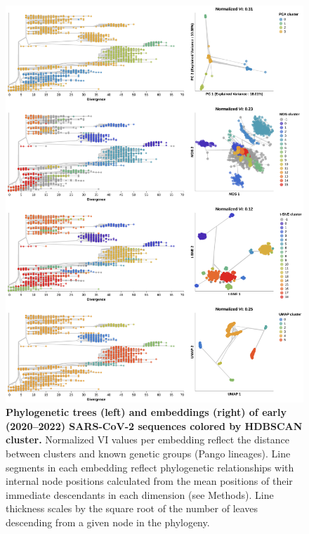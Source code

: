\begin{figure}[!h]
\includegraphics[width=\columnwidth]{figures/sarscov2-embeddings-by-cluster-vs-Nextclade_pango_collapsed.png}
\caption{{\bf Phylogenetic trees (left) and embeddings (right) of early (2020--2022) SARS-CoV-2 sequences colored by HDBSCAN cluster.}
  Normalized VI values per embedding reflect the distance between clusters and known genetic groups (Pango lineages).
  Line segments in each embedding reflect phylogenetic relationships with internal node positions calculated from the mean positions of their immediate descendants in each dimension (see Methods).
  Line thickness scales by the square root of the number of leaves descending from a given node in the phylogeny.
}\label{S_Fig_sarscov2_early_embeddings_by_cluster_vs_Nextclade_pango}
\end{figure}

